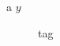 \documentclass[11pt]{article}
\author{root}
\date{\today}
\title{}
\begin{document}
\tableofcontents

\begin{description}
\item[{a \(y\)}] tag
\end{description}
\end{document}

